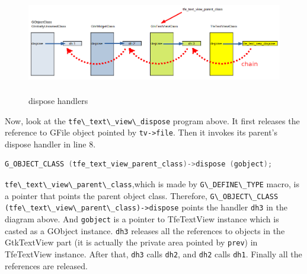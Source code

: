 \begin{figure}
\centering
\includegraphics[width=14.925cm,height=4.455cm]{../image/dispose_handler.png}
\caption{dispose handlers}
\end{figure}

Now, look at the \passthrough{\lstinline!tfe\_text\_view\_dispose!}
program above. It first releases the reference to GFile object pointed
by \passthrough{\lstinline!tv->file!}. Then it invokes its parent's
dispose handler in line 8.

\begin{lstlisting}[language=C]
G_OBJECT_CLASS (tfe_text_view_parent_class)->dispose (gobject);
\end{lstlisting}

\passthrough{\lstinline!tfe\_text\_view\_parent\_class!},which is made
by \passthrough{\lstinline!G\_DEFINE\_TYPE!} macro, is a pointer that
points the parent object class. Therefore,
\passthrough{\lstinline!G\_OBJECT\_CLASS (tfe\_text\_view\_parent\_class)->dispose!}
points the handler \passthrough{\lstinline!dh3!} in the diagram above.
And \passthrough{\lstinline!gobject!} is a pointer to TfeTextView
instance which is casted as a GObject instance.
\passthrough{\lstinline!dh3!} releases all the references to objects in
the GtkTextView part (it is actually the private area pointed by
\passthrough{\lstinline!prev!}) in TfeTextView instance. After that,
\passthrough{\lstinline!dh3!} calls \passthrough{\lstinline!dh2!}, and
\passthrough{\lstinline!dh2!} calls \passthrough{\lstinline!dh1!}.
Finally all the references are released.
